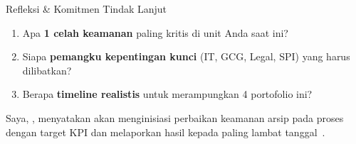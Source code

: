 \documentclass[aspectratio=169,11pt]{beamer}
\begin{document}
\begin{frame}{Refleksi \& Komitmen Tindak Lanjut}
    \vspace{0.2cm}
    \begin{premiumbox}
        \small
        \begin{enumerate}
            \item Apa \textbf{1 celah keamanan} paling kritis di unit Anda saat ini?
            \item Siapa \textbf{pemangku kepentingan kunci} (IT, GCG, Legal, SPI) yang harus dilibatkan?
            \item Berapa \textbf{timeline realistis} untuk merampungkan 4 portofolio ini?
        \end{enumerate}
    \end{premiumbox}
    
    \vspace{0.2cm}
    \begin{orangebox}
        \small
        Saya, \underline{\hspace{2.5cm}}, menyatakan akan menginisiasi perbaikan keamanan arsip pada proses \underline{\hspace{2.5cm}} dengan target KPI \underline{\hspace{2cm}} dan melaporkan hasil kepada \underline{\hspace{2.5cm}} paling lambat tanggal~\underline{\hspace{2cm}}.
    \end{orangebox}
\end{frame}
\end{document}
